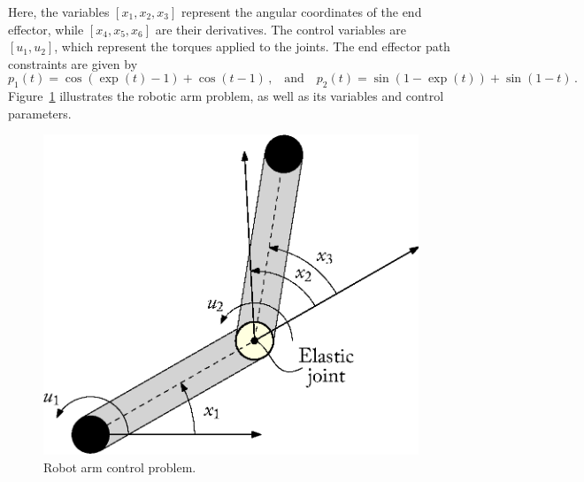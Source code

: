 %
Here, the variables $[x_1, x_2, x_3]$ represent the angular coordinates of the end effector, while $[x_4, x_5, x_6]$ are their derivatives. The control variables are $[u_1, u_2]$, which represent the torques applied to the joints. The end effector path constraints are given by
%
\begin{equation}
  p_1(t) = \cos(\exp(t) - 1) + \cos(t - 1) \, \text{,}
  \quad \text{and} \quad
  p_2(t) = \sin(1 - \exp(t)) + \sin(1 - t) \, \text{.}
\end{equation}
%
Figure~\ref{chap4:fig:robotic_arm} illustrates the robotic arm problem, as well as its variables and control parameters.

\begin{figure}[htb]
  \centering
  \includegraphics[width=0.4\linewidth]{figures/chapter_4/robotic_arm.eps}
  \caption{Robot arm control problem.}
  \label{chap4:fig:robotic_arm}
\end{figure}

